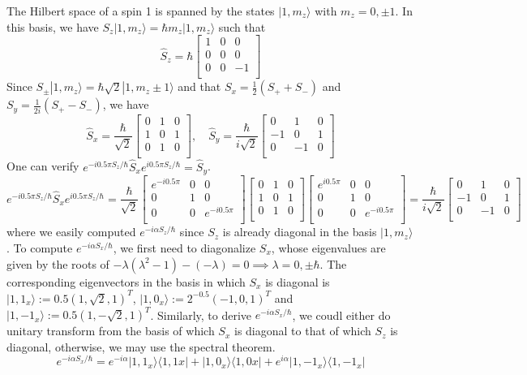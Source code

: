 \documentclass[a4paper]{article}
\begin{document}
\begin{eg}
The Hilbert space of a spin 1 is spanned by the states $|1,m_z\rangle$ with $m_z=0,\pm1$. In this basis, we have $S_z|1,m_z\rangle=\hbar m_z|1,m_z\rangle$ such that
$$\hat{S}_z=\hbar\begin{bmatrix}1&0&0\\0&0&0\\0&0&-1\\\end{bmatrix}$$
Since $S_\pm|1,m_z\rangle=\hbar\sqrt{2}|1,m_z\pm1\rangle$ and that $S_x=\frac{1}{2}(S_++S_-)$ and $S_y=\frac{1}{2i}(S_+-S_-)$, we have
$$\hat{S}_x=\frac{\hbar}{\sqrt{2}}\begin{bmatrix}0&1&0\\1&0&1\\0&1&0\\\end{bmatrix},\quad\hat{S}_y=\frac{\hbar}{i\sqrt{2}}\begin{bmatrix}0&1&0\\-1&0&1\\0&-1&0\\\end{bmatrix}$$
One can verify $e^{-i0.5\pi S_z/\hbar}\hat{S}_xe^{i0.5\pi S_z/\hbar}=\hat{S}_y$.
$$e^{-i0.5\pi S_z/\hbar}\hat{S}_xe^{i0.5\pi S_z/\hbar}=\frac{\hbar}{\sqrt{2}}\begin{bmatrix}e^{-i0.5\pi}&0&0\\0&1&0\\0&0&e^{-i0.5\pi}\\\end{bmatrix}\begin{bmatrix}0&1&0\\1&0&1\\0&1&0\\\end{bmatrix}\begin{bmatrix}e^{i0.5\pi}&0&0\\0&1&0\\0&0&e^{-i0.5\pi}\\\end{bmatrix}=\frac{\hbar}{i\sqrt{2}}\begin{bmatrix}0&1&0\\-1&0&1\\0&-1&0\\\end{bmatrix}$$
where we easily computed $e^{-i\alpha S_z/\hbar}$ since $S_z$ is already diagonal in the basis $|1,m_z\rangle$. To compute $e^{-i\alpha S_x/\hbar}$, we first need to diagonalize $S_x$, whose eigenvalues are given by the roots of $-\lambda(\lambda^2-1)-(-\lambda)=0\implies\lambda=0,\pm\hbar$. The corresponding eigenvectors in the basis in which $S_x$ is diagonal is $|1,1_x\rangle:=0.5(1,\sqrt{2},1)^T$, $|1,0_x\rangle:=2^{-0.5}(-1,0,1)^T$ and $|1,-1_x\rangle:=0.5(1,-\sqrt{2},1)^T$. Similarly, to derive $e^{-i\alpha S_x/\hbar}$, we coudl either do unitary transform from the basis of which $S_x$ is diagonal to that of which $S_z$ is diagonal, otherwise, we may use the spectral theorem.
$$e^{-i\alpha S_x/\hbar}=e^{-i\alpha}|1,1_x\rangle\langle 1,1x|+|1,0_x\rangle\langle 1,0x|+e^{i\alpha}|1,-1_x\rangle\langle 1,-1_x|$$
\end{eg}
\newpage
\end{document}
